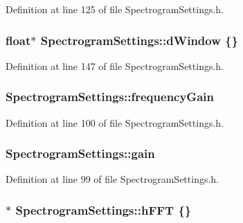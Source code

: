 Definition at line 125 of file Spectrogram\+Settings.\+h.

\subsubsection[{\texorpdfstring{d\+Window}{dWindow}}]{\setlength{\rightskip}{0pt plus 5cm}float$\ast$ Spectrogram\+Settings\+::d\+Window \{\}\hspace{0.3cm}{\ttfamily [mutable]}}\hypertarget{class_spectrogram_settings_ab7e880825e7d4543c7d6d132c7ee1294}{}\label{class_spectrogram_settings_ab7e880825e7d4543c7d6d132c7ee1294}


Definition at line 147 of file Spectrogram\+Settings.\+h.

\subsubsection[{\texorpdfstring{frequency\+Gain}{frequencyGain}}]{ Spectrogram\+Settings\+::frequency\+Gain}\hypertarget{class_spectrogram_settings_a14b8af717362fd3d5e176a5e9a81783d}{}\label{class_spectrogram_settings_a14b8af717362fd3d5e176a5e9a81783d}


Definition at line 100 of file Spectrogram\+Settings.\+h.

\subsubsection[{\texorpdfstring{gain}{gain}}]{ Spectrogram\+Settings\+::gain}\hypertarget{class_spectrogram_settings_a7b3f6f14d24664c63cb888625c251f70}{}\label{class_spectrogram_settings_a7b3f6f14d24664c63cb888625c251f70}


Definition at line 99 of file Spectrogram\+Settings.\+h.

\subsubsection[{\texorpdfstring{h\+F\+FT}{hFFT}}]{$\ast$ Spectrogram\+Settings\+::h\+F\+FT \{\}\hspace{0.3cm}{\ttfamily [mutable]}}\hypertarget{class_spectrogram_settings_a5bdb3fce0f0ee66e99975772f81f951b}{}\label{class_spectrogram_settings_a5bdb3fce0f0ee66e99975772f81f951b}


